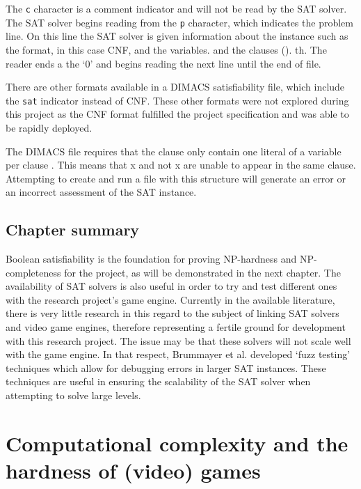 \documentclass[11pt, a4paper, oneside]{report} %
\begin{document}
The \texttt{c} character is a comment indicator and will not be read by the SAT
solver. The SAT solver begins reading from the \texttt{p} character, which
indicates the problem line. On this line the SAT solver is given information
about the instance such as the format, in this case CNF, and the variables.   {}
and the clauses (). th. The reader ends a the `0' and begins reading the next
line until the end of file.

There are other formats available in a DIMACS satisfiability file, which include
the \texttt{sat} indicator instead of CNF\cite{DimacsSatFormat}. These other
formats were not explored during this project as the CNF format fulfilled the
project specification and was able to be rapidly deployed.

The DIMACS file requires that the clause only contain one literal of a variable
per clause \cite{DimacsSatFormat}. This means that x and not x are unable to
appear in the same clause. Attempting to create and run a file with this
structure will generate an error or an incorrect assessment of the SAT instance.


\section{Chapter summary}

Boolean satisfiability is the foundation for proving NP-hardness and NP-
completeness for the project, as will be demonstrated in the next chapter. The
availability of SAT solvers is also useful in order to try and test different
ones with the research project's game engine. Currently in the available
literature, there is very little research in this regard to the subject of
linking SAT solvers and video game engines, therefore representing a fertile
ground for development with this research project. The issue may be that these
solvers will not scale well with the game engine. In that respect, Brummayer et
al. \cite{brummayer2010automated} developed `fuzz testing' techniques which
allow for debugging errors in larger SAT instances. These techniques are useful
in ensuring the scalability of the SAT solver when attempting to solve large
levels.



\chapter{Computational complexity and the hardness of (video) games}
\end{document}
